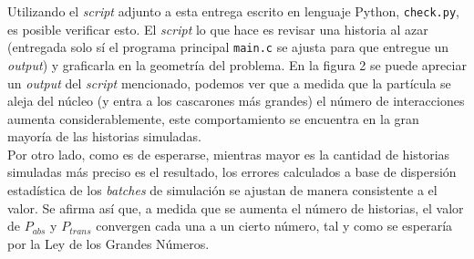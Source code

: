 Utilizando el \emph{script} adjunto a esta entrega escrito en lenguaje Python, \texttt{check.py}, es posible verificar esto. El \emph{script} lo que hace es revisar una historia al azar (entregada solo sí el programa principal \texttt{main.c} se ajusta para que entregue un \emph{output}) y graficarla en la geometría del problema. En la figura 2 se puede apreciar un \emph{output} del \emph{script} mencionado, podemos ver que a medida que la partícula se aleja del núcleo (y entra a los cascarones más grandes) el número de interacciones aumenta considerablemente, este comportamiento se encuentra en la gran mayoría de las historias simuladas.\\

Por otro lado, como es de esperarse, mientras mayor es la cantidad de historias simuladas más preciso es el resultado, los errores calculados a base de dispersión estadística de los \emph{batches} de simulación se ajustan de manera consistente a el valor. Se afirma así que, a medida que se aumenta el número de historias, el valor de $P_{abs}$ y $P_{trans}$ convergen cada una a un cierto número, tal y como se esperaría por la Ley de los Grandes Números.